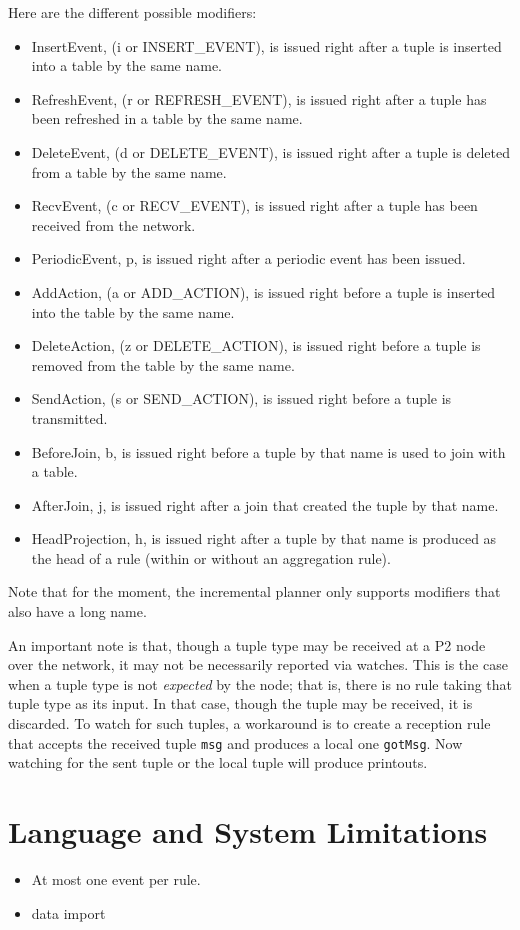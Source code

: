 \documentclass{article}
\begin{document}
Here are the different possible modifiers:
\begin{itemize}
\item InsertEvent, (i or INSERT\_EVENT), is issued right after a tuple is inserted into
  a table by the same name.
\item RefreshEvent, (r or REFRESH\_EVENT), is issued right after a tuple has been refreshed
  in a table by the same name.
\item DeleteEvent, (d or DELETE\_EVENT), is issued right after a tuple is deleted from a
  table by the same name.
\item RecvEvent, (c or RECV\_EVENT), is issued right after a tuple has been received from
  the network.
\item PeriodicEvent, p, is issued right after a periodic event has been issued.
\item AddAction, (a or ADD\_ACTION), is issued right before a tuple is inserted into the
  table by the same name.
\item DeleteAction, (z or DELETE\_ACTION), is issued right before a tuple is removed from
  the table by the same name.
\item SendAction, (s or SEND\_ACTION), is issued right before a tuple is transmitted.
\item BeforeJoin, b, is issued right before a tuple by that name is used
  to join with a table.
\item AfterJoin, j, is issued right after a join that created the tuple
  by that name.
\item HeadProjection, h, is issued right after a tuple by that name is
  produced as the head of a rule (within or without an aggregation rule).
\end{itemize}
Note that for the moment, the incremental planner only supports
modifiers that also have a long name.

An important note is that, though a tuple type may be received at a P2
node over the network, it may not be necessarily reported via
watches. This is the case when a tuple type is not \emph{expected} by
the node; that is, there is no rule taking that tuple type as its
input.  In that case, though the tuple may be received, it is
discarded.  To watch for such tuples, a workaround is to create a
reception rule that accepts the received tuple \lstinline$msg$ and produces a local
one \lstinline$gotMsg$.  Now watching for the sent tuple or the local
tuple will produce printouts.


\section{Language and System Limitations}
\begin{itemize}
\item At most one event per rule.
\item data import
\end{itemize}
\end{document}
